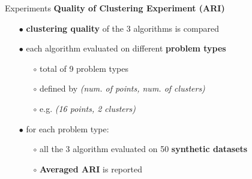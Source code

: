 		\begin{frame}{Experiments}
			\textbf{Quality of Clustering Experiment (ARI)}

			\begin{itemize}
				\item[$\bullet$] \textbf{clustering quality} of the 3 algorithms is compared
				\item[$\bullet$] each algorithm evaluated on different \textbf{problem types}
				\begin{itemize}
					\item[$\circ$] total of 9 problem types 
					\item[$\circ$] defined by \textit{(num. of points, num. of clusters)}
					\item[$\circ$] e.g. \textit{(16 points, 2 clusters)}
				\end{itemize}

				\item[$\bullet$] for each problem type:
				\begin{itemize}
					\item[$\circ$] all the 3 algorithm evaluated on 50 \textbf{synthetic datasets}
					\item[$\circ$] \textbf{Averaged ARI} is reported  
				\end{itemize}
			\end{itemize}

			
		\end{frame}

